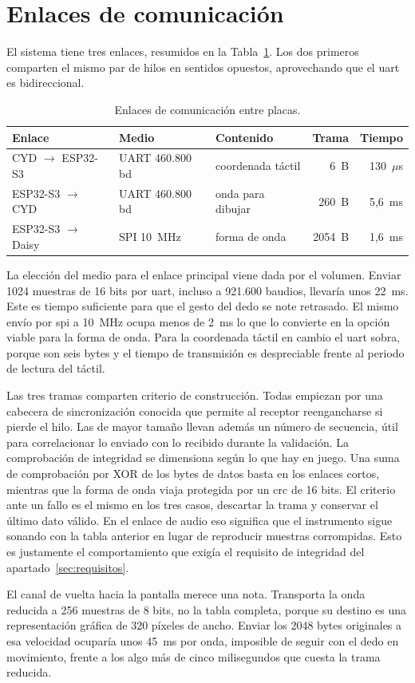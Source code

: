 \section{Enlaces de comunicación}
\label{sec:enlaces}

El sistema tiene tres enlaces, resumidos en la Tabla~\ref{tab:enlaces}. Los dos
primeros comparten el mismo par de hilos en sentidos opuestos, aprovechando que
el \gls{uart} es bidireccional.

\begin{table}[htbp]
    \centering
    \caption{Enlaces de comunicación entre placas.}
    \label{tab:enlaces}
    \begin{tabular}{lllrr}
        \toprule
        \textbf{Enlace} & \textbf{Medio} & \textbf{Contenido} &
        \textbf{Trama} & \textbf{Tiempo} \\
        \midrule
        CYD $\rightarrow$ ESP32-S3 & UART 460.800 bd & coordenada táctil &
        6~B & 130~$\mu$s \\
        ESP32-S3 $\rightarrow$ CYD & UART 460.800 bd & onda para dibujar &
        260~B & 5,6~ms \\
        ESP32-S3 $\rightarrow$ Daisy & SPI 10~MHz & forma de onda &
        2054~B & 1,6~ms \\
        \bottomrule
    \end{tabular}
\end{table}

La elección del medio para el enlace principal viene dada por el volumen. Enviar
1024 muestras de 16 bits por \gls{uart}, incluso a 921.600 baudios, llevaría
unos 22~ms. Este es tiempo suficiente para que el gesto del dedo se note retrasado. El
mismo envío por \gls{spi} a 10~MHz ocupa menos de 2~ms lo que lo convierte en la
opción viable para la forma de onda. Para la coordenada táctil en cambio el \gls{uart} sobra, porque son
seis bytes y el tiempo de transmisión es despreciable frente al periodo de lectura del táctil.

Las tres tramas comparten criterio de construcción. Todas empiezan por una
cabecera de sincronización conocida que permite al receptor reengancharse si
pierde el hilo. Las de mayor tamaño llevan además un número de secuencia, útil
para correlacionar lo enviado con lo recibido durante la validación. La
comprobación de integridad se dimensiona según lo que hay en juego. Una
suma de comprobación por XOR de los bytes de datos basta en los enlaces cortos,
mientras que la forma de onda viaja protegida por un \gls{crc} de 16 bits. El
criterio ante un fallo es el mismo en los tres casos, descartar la trama y
conservar el último dato válido. En el enlace de audio eso significa que el
instrumento sigue sonando con la tabla anterior en lugar de reproducir muestras
corrompidas. Esto es justamente el comportamiento que exigía el requisito de
integridad del apartado~\ref{sec:requisitos}.

El canal de vuelta hacia la pantalla merece una nota. Transporta la onda
reducida a 256 muestras de 8 bits, no la tabla completa, porque su destino es
una representación gráfica de 320 píxeles de ancho. Enviar los 2048 bytes
originales a esa velocidad ocuparía unos 45~ms por onda, imposible de seguir con
el dedo en movimiento, frente a los algo más de cinco milisegundos que cuesta la
trama reducida.
